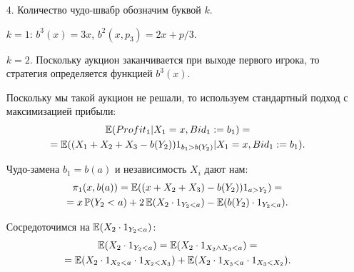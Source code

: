 \begin{enumerate}

\item[4.] Количество чудо-швабр обозначим буквой $k$. 

$ k=1 $: $ b^{3}(x)=3x $, $ b^{2}(x,p_{3})=2x+p/3$.

$ k=2 $. Поскольку аукцион заканчивается при выходе первого игрока, то стратегия определяется функцией $ b^{3}(x)$.

Поскольку мы такой аукцион не решали, то используем стандартный подход с максимизацией прибыли:
\begin{multline}
\operatorname{\mathbb{E}}(Profit_{1}|X_{1}=x,Bid_{1}:=b_{1})=\\
=\operatorname{\mathbb{E}}((X_{1}+X_{2}+X_{3}-b(Y_{2}))1_{b_{1}>b(Y_{2})}|X_{1}=x,Bid_{1}:=b_{1}).
\end{multline}

Чудо-замена $b_{1}=b(a)$ и независимость $ X_{i} $ дают нам:
\begin{multline}
\pi_{1}(x,b(a))=\operatorname{\mathbb{E}}((x+X_{2}+X_{3})-b(Y_{2}))1_{a>Y_{2}})=\\
=x\operatorname{\mathbb{P}}(Y_{2}<a)+2\operatorname{\mathbb{E}}(X_{2}\cdot 1_{Y_{2}<a})-\operatorname{\mathbb{E}}(b(Y_{2})\cdot 1_{Y_{2}<a}).
\end{multline}

Сосредоточимся на $\operatorname{\mathbb{E}}(X_{2}\cdot 1_{Y_{2}<a}) $:
\begin{multline}
\operatorname{\mathbb{E}}(X_{2}\cdot 1_{Y_{2}<a})=\operatorname{\mathbb{E}}(X_{2}\cdot 1_{X_{2}\wedge X_{3}<a})=\\
=\operatorname{\mathbb{E}}(X_{2}\cdot 1_{X_{2}<a}\cdot 1_{X_{2}<X_{3}})+\operatorname{\mathbb{E}}(X_{2}\cdot 1_{X_{3}<a}\cdot 1_{X_{3}<X_{2}}).
\end{multline}


\end{enumerate}
